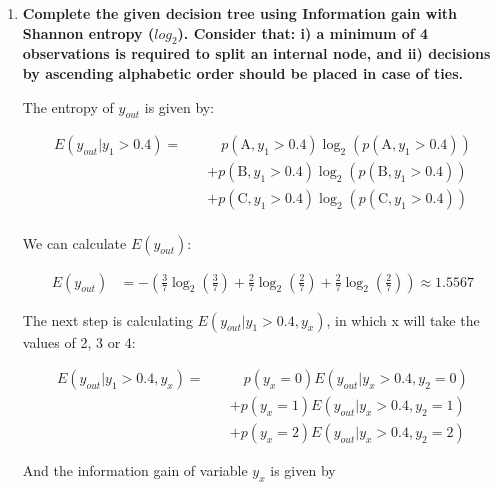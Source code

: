 \documentclass[12pt]{article}
\begin{document}
\begin{enumerate}[leftmargin=\labelsep]
    \item \textbf{Complete the given decision tree using Information gain with Shannon entropy ($log_2$).
    Consider that: i) a minimum of 4 observations is required to split an internal node, and
    ii) decisions by ascending alphabetic order should be placed in case of ties.}

    \vskip 0.3cm
    The entropy of \(y_{out}\) is given by:

    \begin{equation}
        \begin{split}
            E(y_{out} |y_1 > 0.4) = \quad
            & \quad  p(\text{A}, y_1 > 0.4) \log_2 \left(p(\text{A}, y_1 > 0.4)\right) \\
            & + p(\text{B}, y_1 > 0.4) \log_2 \left(p(\text{B}, y_1 > 0.4)\right)      \\
            & + p(\text{C}, y_1 > 0.4) \log_2 \left(p(\text{C}, y_1 > 0.4)\right)      \\
        \end{split}
    \end{equation}

    We can calculate $E(y_{out})$:

    \[
        \begin{aligned}
            E(y_{out}) & = - \left(\frac{3}{7} \log_2\left(\frac{3}{7}\right) + \frac{2}{7} \log_2\left(\frac{2}{7}\right)
                            + \frac{2}{7} \log_2\left(\frac{2}{7}\right)\right) \approx 1.5567
        \end{aligned}
    \]

    The next step is calculating $E(y_{out} | y_1 > 0.4 , y_x)$, in which x will take the values of 2, 3 or 4:

    \begin{equation}\label{exI1-e-yout-y2}
        \begin{split}
            E(y_{out} |y_1 > 0.4 , y_x) = \quad
            & \quad  p(y_x = 0) E(y_{out} | y_x > 0.4 , y_2 = 0) \\
            & + p(y_x = 1) E(y_{out} | y_x > 0.4 , y_2 = 1) \\
            & + p(y_x = 2) E(y_{out} | y_x > 0.4 , y_2 = 2)
        \end{split}
    \end{equation}

    And the information gain of variable $y_x$ is given by


\end{enumerate}
\end{document}
